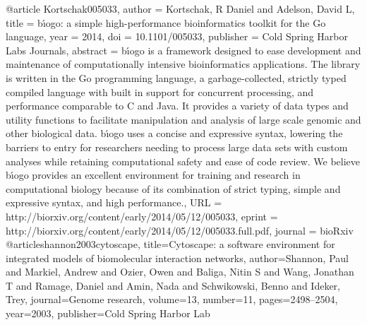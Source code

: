 @article {Kortschak005033,
	author = {Kortschak, R Daniel and Adelson, David L},
	title = {b{\'\i}ogo: a simple high-performance bioinformatics toolkit for the Go language},
	year = {2014},
	doi = {10.1101/005033},
	publisher = {Cold Spring Harbor Labs Journals},
	abstract = {b{\'\i}ogo is a framework designed to ease development and maintenance of computationally intensive bioinformatics applications. The library is written in the Go programming language, a garbage-collected, strictly typed compiled language with built in support for concurrent processing, and performance comparable to C and Java. It provides a variety of data types and utility functions to facilitate manipulation and analysis of large scale genomic and other biological data. b{\'\i}ogo uses a concise and expressive syntax, lowering the barriers to entry for researchers needing to process large data sets with custom analyses while retaining computational safety and ease of code review. We believe b{\'\i}ogo provides an excellent environment for training and research in computational biology because of its combination of strict typing, simple and expressive syntax, and high performance.},
	URL = {http://biorxiv.org/content/early/2014/05/12/005033},
	eprint = {http://biorxiv.org/content/early/2014/05/12/005033.full.pdf},
	journal = {bioRxiv}
}
@article{shannon2003cytoscape,
  title={Cytoscape: a software environment for integrated models of biomolecular
  interaction networks},
    author={Shannon, Paul and Markiel, Andrew and Ozier, Owen and Baliga, Nitin
    S and Wang, Jonathan T and Ramage, Daniel and Amin, Nada and Schwikowski,
    Benno and Ideker, Trey},
      journal={Genome research},
        volume={13},
          number={11},
            pages={2498--2504},
              year={2003},
                publisher={Cold Spring Harbor Lab}
}
